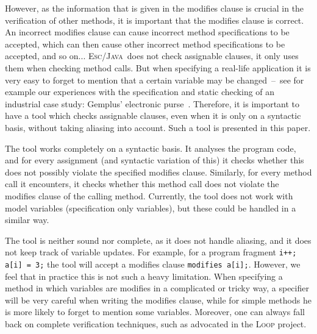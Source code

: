 \documentclass[a4paper]{llncs}
\newcommand{\escj}{\textsc{Esc/Java}}
\begin{document}
However, as the information that is given in the modifies clause is
crucial in the verification of other methods, it is important that the
modifies clause is correct. An incorrect modifies clause can cause
incorrect method specifications to be accepted, which can then cause
other incorrect method specifications to be accepted, and so
on... \escj\ does not check assignable clauses, it only uses them when
checking method calls. But when specifying a real-life application it
is very easy to forget to mention that a certain variable may be
changed~--~see for example our experiences with the specification and
static checking of an industrial case study: Gemplus' electronic
purse~\cite{CatanoH02a}. Therefore, it is important to have a tool
which checks assignable clauses, even when it is only on a syntactic
basis, without taking aliasing into account. Such a tool is presented
in this paper.

The tool works completely on a syntactic basis. It analyses the
program code, and for every assignment (and syntactic variation of
this) it checks whether this does not possibly violate the specified
modifies clause. Similarly, for every method call it encounters, it
checks whether this method call does not violate the modifies clause
of the calling method. Currently, the tool does not work with model
variables (specification only variables), but these could be handled
in a similar way.

The tool is neither sound nor complete, as it does not handle
aliasing, and it does not keep track of variable updates. For example,
for a program fragment \texttt{i++; a[i] = 3;} the tool will accept a
modifies clause \texttt{modifies a[i];}. However, we feel that in
practice this is not such a heavy limitation. When specifying a method
in which variables are modifies in a complicated or tricky way, a
specifier will be very careful when writing the modifies clause,
while for simple methods he is more likely to forget to mention some
variables. Moreover, one can always fall back on complete verification
techniques, such as advocated in the \textsc{Loop} project.

\end{document}
